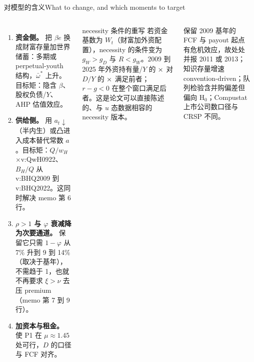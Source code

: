\documentclass[aspectratio=169,10pt]{beamer}
\newcommand{\val}[1]{\csname v:#1\endcsname}
\begin{document}
\begin{frame}{对模型的含义}{What to change, and which moments to target}
\begin{columns}[T]
{\small
\begin{enumerate}\setlength{\itemsep}{0.22cm}
\item \textbf{资金侧。} 把 $\beta e$ 换成财富存量加世界储蓄：多期或 perpetual-youth 结构，$\bar\omega^*$ 上升。目标矩：隐含 $\beta$、股权负债/$Y$、AHP 估值效应。
\item \textbf{供给侧。} 用 $a_t\downarrow$（半内生）或凸进入成本替代常数 $a$。目标矩：$Q/w_H$ $\times$\val{QwH0922}、$B_H/Q$ 从 \val{BHQ2009} 到 \val{BHQ2022}。这同时解决 memo 第 6 行。
\item \textbf{$\rho>1$ 与 $\varphi$ 衰减降为次要通道。} 保留它只需 $1-\varphi$ 从 7\% 升到 9 到 14\%（取决于基年），不需趋于 1，也就不再要求 $\xi>\nu$ 去压 premium（memo 第 7 到 9 行）。
\item \textbf{加资本与租金。} 使 P1 在 $\mu\approx1.45$ 处可行，$D$ 的口径与 FCF 对齐。
\end{enumerate}}
\begin{block}{necessity 条件的重写}
\small 若资金基数为 $W_t$（财富加外资配置），necessity 的条件变为 $g_W>g_D$ 与 $R<g_W$。2009 到 2025 年外资持有量/$Y$ 的 $\times\val{ELYmult}$ 对 $D/Y$ 的 $\times\val{DYmult}$ 满足前者；$r-g<0$ 在整个窗口满足后者。这是论文可以直接陈述的、与 $u$ 态数据相容的 necessity 版本。
\end{block}
\begin{block}{保留}
\small 2009 基年的 FCF 与 payout 起点有危机效应，故处处并报 2011 或 2013；知识存量增速 convention-driven；队列检验含并购偏差但偏向 H$_0$；Compustat 上市公司数口径与 CRSP 不同。
\end{block}
\end{columns}
\end{frame}
\end{document}
